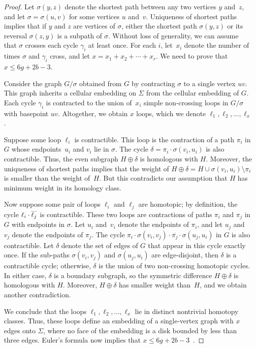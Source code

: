 \documentclass[11pt,twoside]{article}
\def\reverse#1{\smash{\overline{#1}}}
\begin{document}
\begin{proof}
Let $\sigma(y,z)$ denote the shortest path between any two vertices $y$ and~$z$, and let $\sigma = \sigma(u,v)$ for some vertices $u$ and~$v$.  Uniqueness of shortest paths implies that if $y$ and $z$ are vertices of $\sigma$, either the shortest path $\sigma(y,z)$ or its reversal $\sigma(z,y)$ is a subpath of $\sigma$.  Without loss of generality, we can assume that $\sigma$ crosses each cycle $\gamma_i$ at least once.  For each $i$, let~$x_i$ denote the number of times $\sigma$ and $\gamma_i$ cross, and let $x = x_1 + x_2 + \cdots + x_r$.  We need to prove that $x\le 6g+2b-3$.

Consider the graph $G/\sigma$ obtained from $G$ by contracting $\sigma$ to a single vertex $uv$.  This graph inherits a cellular embedding on $\Sigma$ from the cellular embedding of $G$.  Each cycle $\gamma_i$ is contracted to the union of~$x_i$ simple non-crossing loops in $G/\sigma$ with basepoint $uv$.  Altogether, we obtain $x$ loops, which we denote $\ell_1, \ell_2, \dots, \ell_x$.

Suppose some loop $\ell_i$ is contractible.  This loop is the contraction of a path $\pi_i$ in $G$ whose endpoints~$u_i$ and $v_i$ lie in $\sigma$.  The cycle $\delta = \pi_i \cdot \sigma(v_i,u_i)$ is also contractible.  Thus, the even subgraph $H\oplus\delta$ is homologous with $H$.  Moreover, the uniqueness of shortest paths implies that the weight of $H\oplus\delta = H \cup \sigma(v_i,u_i) \setminus \pi_i$ is smaller than the weight of~$H$.  But this contradicts our assumption that $H $ has minimum weight in its homology class.

Now suppose some pair of loops $\ell_i$ and $\ell_j$ are homotopic; by definition, the cycle $\ell_i\cdot\reverse{\ell_j}$ is contractible.  These two loops are contractions of paths $\pi_i$ and $\pi_j$ in $G$ with endpoints in $\sigma$.  Let $u_i$ and~$v_i$ denote the endpoints of $\pi_i$, and let $u_j$ and~$v_j$ denote the endpoints of $\pi_j$.  The cycle $\pi_i \cdot \sigma(v_i,v_j) \cdot \overline{\pi_j} \cdot \sigma(u_j, u_i)$ in $G$ is also contractible.  Let $\delta$ denote the set of edges of $G$ that appear in this cycle exactly once.  If the sub-paths $\sigma(v_i,v_j)$ and $\sigma(u_j, u_i)$ are edge-disjoint, then $\delta$ is a contractible cycle; otherwise, $\delta$ is the union of two non-crossing homotopic cycles.  In either case, $\delta$ is a boundary subgraph, so the symmetric difference $H\oplus\delta$ is homologous with $H$.  Moreover, $H\oplus\delta$ has smaller weight than~$H$, and we obtain another contradiction.

We conclude that the loops $\ell_1, \ell_2, \dots, \ell_x$ lie in distinct nontrivial homotopy classes.  Thus, these loops define an embedding of a single-vertex graph with $x$ edges onto $\Sigma$, where no face of the embedding is a disk bounded by less than three edges.  Euler's formula now implies that $x\le 6g+2b-3$~\cite[Lemma~2.1]{ccelw-scsih-08}.
\end{proof}
\end{document}
